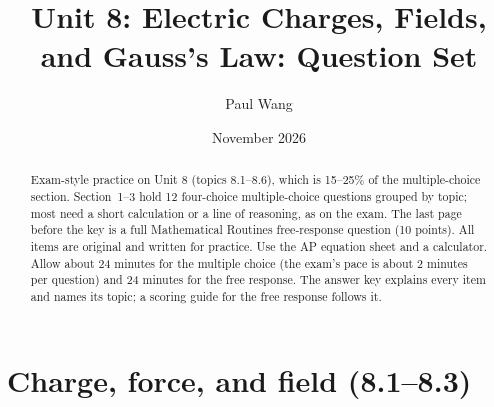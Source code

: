 \documentclass[11pt]{article}
\title{Unit 8: Electric Charges, Fields, and Gauss's Law: Question Set}
\author{Paul Wang}
\date{November 2026}
\begin{document}
\maketitle

\begin{abstract}
Exam-style practice on Unit 8 (topics 8.1--8.6), which is 15--25\% of the multiple-choice section. Section~1--3 hold 12 four-choice multiple-choice questions grouped by topic; most need a short calculation or a line of reasoning, as on the exam. The last page before the key is a full Mathematical Routines free-response question (10 points). All items are original and written for practice. Use the AP equation sheet and a calculator. Allow about 24 minutes for the multiple choice (the exam's pace is about 2 minutes per question) and 24 minutes for the free response. The answer key explains every item and names its topic; a scoring guide for the free response follows it.
\end{abstract}


\section{Charge, force, and field (8.1--8.3)}
\end{document}
